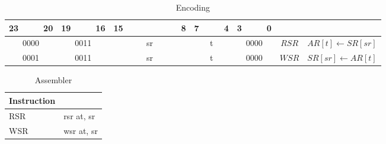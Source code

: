 	\begin{longtable}{llllllllllllllllllllllll  p{1cm}  p{6cm} | }
		\caption{Encoding\label{long}}\\
		23 & & & 20 & 19 & & & 16 & 15 & & & & & & & 8 & 7 & & & 4 & 3 & & & 0 & & \multicolumn{1}{c}{}\\
		\hline
		\multicolumn{4}{|c|}{0000} & \multicolumn{4}{c|}{0011} & \multicolumn{8}{c|}{sr} & \multicolumn{4}{c|}{t} & \multicolumn{4}{c|}{0000} & \multicolumn{1}{c|}{$RSR$} & $AR[t] \leftarrow SR[sr]$ \\ \hline
		\multicolumn{4}{|c|}{0001} & \multicolumn{4}{c|}{0011} & \multicolumn{8}{c|}{sr} & \multicolumn{4}{c|}{t} & \multicolumn{4}{c|}{0000} & \multicolumn{1}{c|}{$WSR$} & $SR[sr] \leftarrow AR[t]$ \\ \hline
	\end{longtable}

	\begin{longtable}{|p{5cm}|p{5cm}|}
		\caption{Assembler\label{long}}\\
		\hline
		Instruction & \\
		\hline
		RSR & rsr at, sr\\ \hline
		WSR & wsr at, sr\\ \hline
	\end{longtable}
